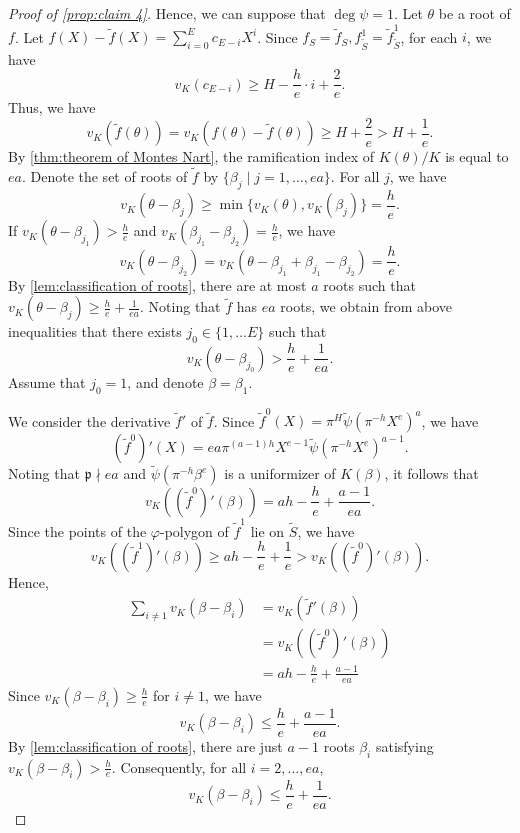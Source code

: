 \documentclass[10pt,a4paper]{amsart}
\numberwithin{equation}{section}
\begin{document}
\begin{proof}[Proof of \cref{prop:claim 4}]
    Hence, we can suppose that $\deg \psi = 1$. Let $\theta$ be a root of $f$. 
    Let $f(X) - \tilde{f}(X) = \sum_{i = 0}^E c_{E - i}X^i$. 
    Since $f_S = \tilde{f}_S, f_{\tilde{S}}^1 = \tilde{f}_{\tilde{S}}^1$, 
    for each $i$, we have 
    \[
      v_K(c_{E - i}) \ge H - \frac{h}{e} \cdot i + \frac{2}{e}. 
    \]
    Thus, we have 
    \[
      v_K(\tilde{f}(\theta)) = v_K(f(\theta) - \tilde{f}(\theta)) \ge H + \frac{2}{e} > H + \frac{1}{e}. 
    \]
    By \cref{thm:theorem of Montes Nart}, the ramification index of $K(\theta)/K$ is equal to $ea$. 
    Denote the set of roots of $\tilde{f}$ by $\{\beta_j \mid j = 1, \dots ,ea\}$. 
    For all $j$, we have 
    \[
      v_K(\theta - \beta_j) \ge \min\{v_K(\theta),v_K(\beta_j)\} = \frac{h}{e}. 
    \]
    If $v_K(\theta - \beta_{j_1}) > \frac{h}{e}$ and $v_K(\beta_{j_1} - \beta_{j_2}) = \frac{h}{e}$, we have 
    \[
      v_K(\theta - \beta_{j_2}) = v_K(\theta - \beta_{j_1} + \beta_{j_1} - \beta_{j_2}) = \frac{h}{e}. 
    \]
    By \cref{lem:classification of roots}, there are at most $a$ roots such that $v_K(\theta - \beta_j) \ge \frac{h}{e} + \frac{1}{ea}$. 
    Noting that $\tilde{f}$ has $ea$ roots, we obtain from above inequalities that there exists $j_0 \in \{1, \dots E\}$ such that 
    \[
      v_K(\theta - \beta_{j_0}) > \frac{h}{e} + \frac{1}{ea} \label{formula:prop4-2}. 
    \]
    Assume that $j_0 = 1$, and denote $\beta = \beta_1$. 

    We consider the derivative $\tilde{f}'$ of $\tilde{f}$. 
    Since $\tilde{f}^0(X) = \pi^H\tilde{\psi}(\pi^{-h}X^e)^a$, we have 
    \[
      (\tilde{f}^0)'(X) = ea\pi^{(a-1)h}X^{e - 1}\tilde{\psi}(\pi^{-h}X^e)^{a - 1}. 
    \]
    Noting that $\mathfrak{p} \nmid ea$ and $\tilde{\psi}(\pi^{-h}\beta^e)$ is a uniformizer of $K(\beta)$, it follows that 
    \[
      v_K((\tilde{f}^0)'(\beta)) = ah - \frac{h}{e} +\frac{a - 1}{ea}. 
    \]
    Since the points of  the $\varphi$-polygon of $\tilde{f}^1$ lie on $\tilde{S}$, we have 
    \[
      v_K((\tilde{f}^1)'(\beta)) \ge ah - \frac{h}{e} + \frac{1}{e} > v_K((\tilde{f}^0)'(\beta)). 
    \]
    Hence, 
    \begin{align}
      \sum_{i \ne 1} v_K(\beta - \beta_i) &= v_K(\tilde{f}'(\beta)) \\ 
      &=v_K((\tilde{f}^0)'(\beta)) \\
      &= ah - \frac{h}{e} + \frac{a - 1}{ea}
    \end{align}
    Since $v_K(\beta - \beta_i) \ge \frac{h}{e}$ for $i \ne 1$, we have 
    \[
      v_K(\beta - \beta_i) \le \frac{h}{e} + \frac{a - 1}{ea}. 
    \]
    By \cref{lem:classification of roots}, there are just $a - 1$ roots $\beta_i$ satisfying $v_K(\beta - \beta_i) > \frac{h}{e}$. 
    Consequently, for all $i = 2, \dots ,ea$, 
    \[
      v_K(\beta - \beta_i) \le \frac{h}{e} + \frac{1}{ea}. \label{formula:prop4-3}
    \]


\end{proof}
\end{document}
